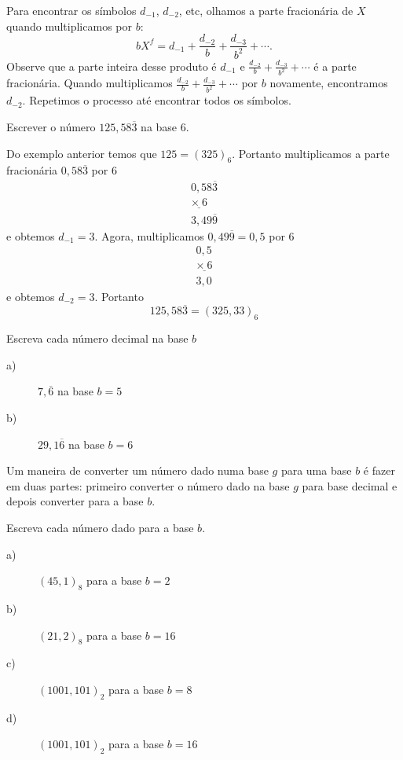 Para encontrar os símbolos $d_{-1}$, $d_{-2}$, etc, olhamos a parte fracionária de $X$ quando multiplicamos por $b$:
$$
bX^{f}=d_{-1}+\frac{d_{-2}}{b}+\frac{d_{-3}}{b^2}+\cdots.
$$
Observe que a parte inteira desse produto é $d_{-1}$ e $\frac{d_{-2}}{b}+\frac{d_{-3}}{b^2}+\cdots$ é a parte fracionária. Quando multiplicamos $\frac{d_{-2}}{b}+\frac{d_{-3}}{b^2}+\cdots$ por $b$ novamente, encontramos $d_{-2}$. Repetimos o processo até encontrar todos os símbolos.
\begin{ex}Escrever o número $125,58\overline{3}$ na base $6$.

Do exemplo anterior temos que $125=(325)_6$. Portanto multiplicamos a parte fracionária $0,58\overline{3}$ por $6$
$$
\begin{array}{l}
0,58\overline{3}\\
\underline{\times\ 6}\\
3,49 \overline{9}
\end{array}
$$
e obtemos $d_{-1}=3$. Agora, multiplicamos $0,49\overline{9}=0,5$ por $6$
$$
\begin{array}{l}
0,5\\
\underline{\times\ 6}\\
3,0
\end{array}
$$
e obtemos $d_{-2}=3$. Portanto
$$
125,58\overline{3}=(325,33)_6
$$
\end{ex}
\begin{prob} Escreva cada número decimal na base $b$

\begin{description}
\item[a)] $7,\overline{6}$ na base $b=5$
\item[b)] $29,1\overline{6}$ na base $b=6$
\end{description}
\end{prob}

Um maneira de converter um número dado numa base $g$ para uma base $b$ é fazer em duas partes: primeiro converter o número dado na base $g$ para base decimal e depois converter para a base $b$.

\begin{prob} Escreva cada número dado para a base $b$.

\begin{description}
\item[a)] $(45,1)_8$ para a base $b=2$
\item[b)] $(21,2)_8$ para a base $b=16$
\item[c)] $(1001,101)_2$ para a base $b=8$
\item[d)] $(1001,101)_2$ para a base $b=16$
\end{description}
\end{prob}








